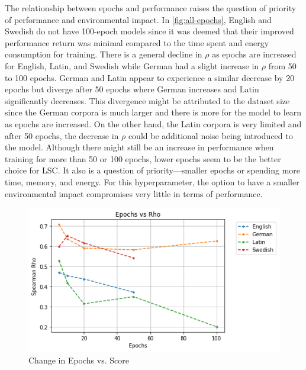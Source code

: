 The relationship between epochs and performance raises the question of priority of performance and environmental impact. In \autoref{fig:all-epochs}, English and Swedish do not have 100-epoch models since it was deemed that their improved performance return was minimal compared to the time spent and energy consumption for training. There is a general decline in $\rho$ as epochs are increased for English, Latin, and Swedish while German had a slight increase in $\rho$ from 50 to 100 epochs. German and Latin appear to experience a similar decrease by 20 epochs but diverge after 50 epochs where German increases and Latin significantly decreases. This divergence might be attributed to the dataset size since the German corpora is much larger and there is more for the model to learn as epochs are increased. On the other hand, the Latin corpora is very limited and after 50 epochs, the decrease in $\rho$ could be additional noise being introduced to the model. Although there might still be an increase in performance when training for more than 50 or 100 epochs, lower epochs seem to be the better choice for LSC. It also is a question of priority—smaller epochs or spending more time, memory, and energy. For this hyperparameter, the option to have a smaller environmental impact compromises very little in terms of performance. 

\begin{figure}[h]
  \centering
  \includegraphics[width=.8\linewidth]{sections/figures/epochs_all.png}
  \caption{Change in Epochs vs. Score}
  \label{fig:all-epochs}
\end{figure}

